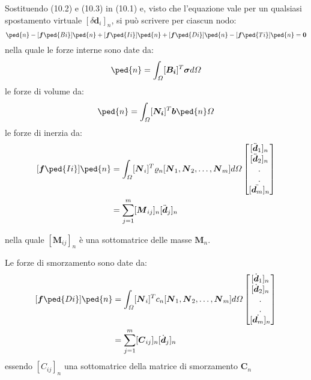 Sostituendo (10.2) e (10.3) in (10.1) e, visto che l'equazione vale per un qualsiasi spostamento virtuale $[\delta\boldsymbol{d}_i]_n$, si può scrivere per ciascun nodo:
\begin{equation}
	[\boldsymbol{p}\ped{i}]\ped{n}-[\boldsymbol{f}\ped{Bi}]\ped{n}+[\boldsymbol{f}\ped{Ii}]\ped{n}+[\boldsymbol{f}\ped{Di}]\ped{n}-[\boldsymbol{f}\ped{Ti}]\ped{n}=\textbf{0}
\end{equation}
nella quale le forze interne sono date da:
\begin{equation}
	[\boldsymbol{p}\ped{i}]\ped{n} = \int_\varOmega[\boldsymbol{B_i}]^T\boldsymbol{\sigma}d\varOmega
\end{equation}
le forze di volume da:
\begin{equation}
	[\boldsymbol{f}\ped{Bi}]\ped{n} = \int_\varOmega[\boldsymbol{N_i}]^T\boldsymbol{b}\ped{n}\varOmega
\end{equation}
le forze di inerzia da:
\begin{equation}
	\begin{split}
	[\boldsymbol{f}\ped{Ii}]\ped{n} & = \int_\varOmega[\boldsymbol{N}_i]^T\varrho_n[\boldsymbol{N}_1,\boldsymbol{N}_2, \dots, \boldsymbol{N}_m]d\varOmega 		
	\begin{bmatrix}
		[\ddot{\boldsymbol{d}}_1]_n \\
		[\ddot{\boldsymbol{d}}_2]_n \\
		. \\
		. \\
		[\ddot{\boldsymbol{d}_m}]_n
	\end{bmatrix}	\\
	& = \sum_{j=1}^{m}[\boldsymbol{M}_{ij}]_n[\ddot{\boldsymbol{d}}_j]_n
	\end{split}
\end{equation}

nella quale $[\boldsymbol{M}_{ij}]_n$ è una sottomatrice delle masse $\mathbf{M}_n$.

Le forze di smorzamento sono date da:
\begin{equation}
	\begin{split}		
	[\boldsymbol{f}\ped{Di}]\ped{n} & = \int_\varOmega[\boldsymbol{N}_i]^Tc_n[\boldsymbol{N}_1,\boldsymbol{N}_2, \dots, \boldsymbol{N}_m]d\varOmega 		
	\begin{bmatrix}
		[\dot{\boldsymbol{d}}_1]_n \\
		[\dot{\boldsymbol{d}}_2]_n \\
		. \\
		. \\
		[\dot{\boldsymbol{d}_m}]_n
	\end{bmatrix} \\	
	& = \sum_{j=1}^{m}[\boldsymbol{C}_{ij}]_n[\dot{\boldsymbol{d}}_j]_n
	\end{split}
\end{equation}
essendo $[C_{ij}]_n$ una sottomatrice della matrice di smorzamento $\mathbf{C}_n$

